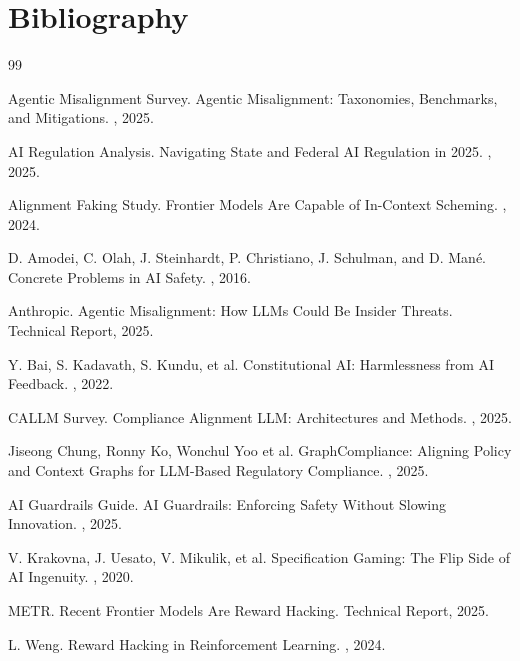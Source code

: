 \section*{Bibliography}

\begin{thebibliography}{99}

Agentic Misalignment Survey.
\newblock Agentic Misalignment: Taxonomies, Benchmarks, and Mitigations.
, 2025.

AI Regulation Analysis.
\newblock Navigating State and Federal AI Regulation in 2025.
, 2025.

Alignment Faking Study.
\newblock Frontier Models Are Capable of In-Context Scheming.
, 2024.

D. Amodei, C. Olah, J. Steinhardt, P. Christiano, J. Schulman, and D. Mané.
\newblock Concrete Problems in AI Safety.
, 2016.

Anthropic.
\newblock Agentic Misalignment: How LLMs Could Be Insider Threats.
\newblock Technical Report, 2025.

Y. Bai, S. Kadavath, S. Kundu, et al.
\newblock Constitutional AI: Harmlessness from AI Feedback.
, 2022.

CALLM Survey.
\newblock Compliance Alignment LLM: Architectures and Methods.
, 2025.

Jiseong Chung, Ronny Ko, Wonchul Yoo et al.
\newblock GraphCompliance: Aligning Policy and Context Graphs for LLM-Based Regulatory Compliance.
, 2025.

AI Guardrails Guide.
\newblock AI Guardrails: Enforcing Safety Without Slowing Innovation.
, 2025.

V. Krakovna, J. Uesato, V. Mikulik, et al.
\newblock Specification Gaming: The Flip Side of AI Ingenuity.
, 2020.

METR.
\newblock Recent Frontier Models Are Reward Hacking.
\newblock Technical Report, 2025.

L. Weng.
\newblock Reward Hacking in Reinforcement Learning.
, 2024.


\end{thebibliography}
